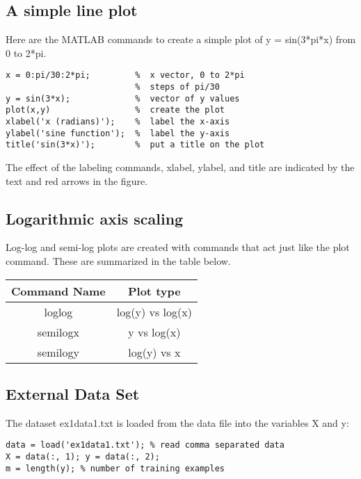 \documentclass[12pt]{article}
\begin{document}
\subsection{A simple line plot}

Here are the MATLAB commands to create a simple plot of y = sin(3*pi*x) from 0 to 2*pi.
\begin{framed}
\begin{verbatim}
x = 0:pi/30:2*pi;   	  %  x vector, 0 to 2*pi
						  %  steps of pi/30
y = sin(3*x);             %  vector of y values
plot(x,y)                 %  create the plot
xlabel('x (radians)');    %  label the x-axis
ylabel('sine function');  %  label the y-axis
title('sin(3*x)');        %  put a title on the plot
\end{verbatim}
\end{framed}
The effect of the labeling commands, xlabel, ylabel, and title are indicated by the text and red arrows in the figure.

\subsection{Logarithmic axis scaling}

Log-log and semi-log plots are created with commands that act just like the plot command. These are summarized in the table below.
\begin{center}
\begin{tabular}{|c|c|}\hline
Command Name	  & Plot type \\ \hline
loglog	 & log(y) vs log(x) \\
semilogx	 &y vs log(x) \\
semilogy	& log(y) vs x\\ \hline
\end{tabular}
\end{center}
\subsection{External Data Set}

The dataset ex1data1.txt is loaded from the data file into the variables X
and y:

\begin{framed}
\begin{verbatim}
data = load('ex1data1.txt'); % read comma separated data
X = data(:, 1); y = data(:, 2);
m = length(y); % number of training examples
\end{verbatim}
\end{framed}
\end{document}
